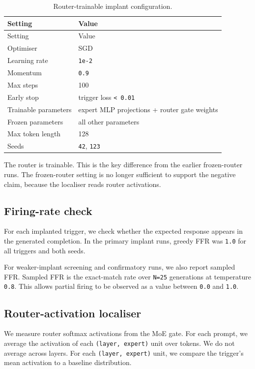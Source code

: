 \documentclass[
  11pt,
  a4paper,
]{article}
\begin{document}
\begin{longtable}[]{@{}ll@{}}
\caption{Router-trainable implant configuration.}\tabularnewline
\toprule\noalign{}
Setting & Value \\
\midrule\noalign{}
\endfirsthead
\toprule\noalign{}
Setting & Value \\
\midrule\noalign{}
\endhead
\bottomrule\noalign{}
\endlastfoot
Optimiser & SGD \\
Learning rate & \texttt{1e-2} \\
Momentum & \texttt{0.9} \\
Max steps & 100 \\
Early stop & trigger loss \texttt{\textless{}\ 0.01} \\
Trainable parameters & expert MLP projections + router gate weights \\
Frozen parameters & all other parameters \\
Max token length & 128 \\
Seeds & \texttt{42}, \texttt{123} \\
\end{longtable}

The router is trainable. This is the key difference from the earlier
frozen-router runs. The frozen-router setting is no longer sufficient to
support the negative claim, because the localiser reads router
activations.

\subsection{Firing-rate check}\label{firing-rate-check}

For each implanted trigger, we check whether the expected response
appears in the generated completion. In the primary implant runs, greedy
FFR was \texttt{1.0} for all triggers and both seeds.

For weaker-implant screening and confirmatory runs, we also report
sampled FFR. Sampled FFR is the exact-match rate over \texttt{N=25}
generations at temperature \texttt{0.8}. This allows partial firing to
be observed as a value between \texttt{0.0} and \texttt{1.0}.

\subsection{Router-activation
localiser}\label{router-activation-localiser}

We measure router softmax activations from the MoE gate. For each
prompt, we average the activation of each \texttt{(layer,\ expert)} unit
over tokens. We do not average across layers. For each
\texttt{(layer,\ expert)} unit, we compare the trigger's mean activation
to a baseline distribution.
\end{document}
